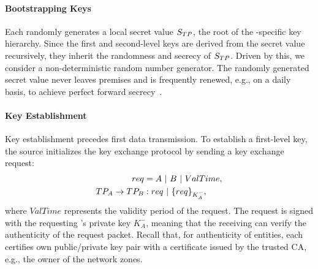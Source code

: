 \paragraph{Bootstrapping Keys}
Each \tp randomly generates a local secret value $S_{TP}$, the root of the \tp-specific 
key hierarchy. Since the first and second-level keys are derived from the secret value 
recursively, they inherit the randomness and secrecy of $S_{TP}$. Driven by this, we 
consider a non-deterministic random number generator. The randomly generated secret value 
never leaves \tp premises and is frequently renewed, e.g., on a daily basis, to achieve 
perfect forward secrecy~\cite{rfc1363}.




\paragraph{Key Establishment}
Key establishment precedes first data transmission. To establish a first-level key, 
the source \tp initializes the key exchange protocol by sending a key exchange request:
\noindent 
\begin{subequations}
	\begin{align}
		req                     & = A~|~B~|~ValTime,       \\
		TP_A \rightarrow TP_B & : req~|~\{req\}_{K^-_A}, 
	\end{align}
	\label{eq:req}
\end{subequations}
\noindent 
where $ValTime$ represents the validity period of the request. The request is signed with
the requesting \tp's private key ${K^-_A}$, meaning that the receiving \tp can verify the
authenticity of the request packet. Recall that, for authenticity of \name entities, each
\tp certifies own public/private key pair with a certificate issued by the trusted CA,
e.g., the owner of the network zones.

